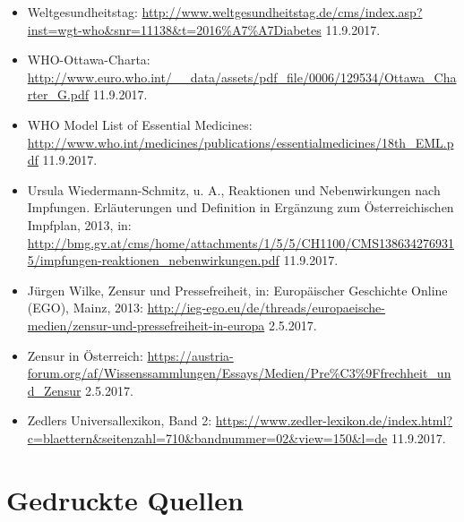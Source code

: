\documentclass[
    a4paper,
    12pt,
    hyphens,
    chapterprefix=true,
    headheight=33pt,
    footheight=29pt,
    headings=optiontohead, %
]{scrartcl}
\begin{document}
{\begin{itemize}
\item{Weltgesundheitstag: \url{http://www.weltgesundheitstag.de/cms/index.asp?inst=wgt-who&snr=11138&t=2016\%A7\%A7Diabetes} 11.9.2017.}
\item{WHO-Ottawa-Charta: \url{http://www.euro.who.int/__data/assets/pdf_file/0006/129534/Ottawa_Charter_G.pdf} 11.9.2017.}
\item{WHO Model List of Essential Medicines: \url{http://www.who.int/medicines/publications/essentialmedicines/18th_EML.pdf} 11.9.2017.}
\item{Ursula Wiedermann-Schmitz, u. A., Reaktionen und Nebenwirkungen nach Impfungen. Erläuterungen und Definition in Ergänzung zum Österreichischen Impfplan, 2013, in: \url{http://bmg.gv.at/cms/home/attachments/1/5/5/CH1100/CMS1386342769315/impfungen-reaktionen_nebenwirkungen.pdf} 11.9.2017.}
\item{Jürgen Wilke, Zensur und Pressefreiheit, in: Europäischer Geschichte Online (EGO), Mainz, 2013: \url{http://ieg-ego.eu/de/threads/europaeische-medien/zensur-und-pressefreiheit-in-europa} 2.5.2017.}
\item{Zensur in Österreich: \url{https://austria-forum.org/af/Wissenssammlungen/Essays/Medien/Pre\%C3\%9Ffrechheit_und_Zensur} 2.5.2017.}
\item{Zedlers Universallexikon, Band 2: \url{https://www.zedler-lexikon.de/index.html?c=blaettern&seitenzahl=710&bandnummer=02&view=150&l=de} 11.9.2017.}
\end{itemize}


\section{Gedruckte Quellen}

}
\end{document}
